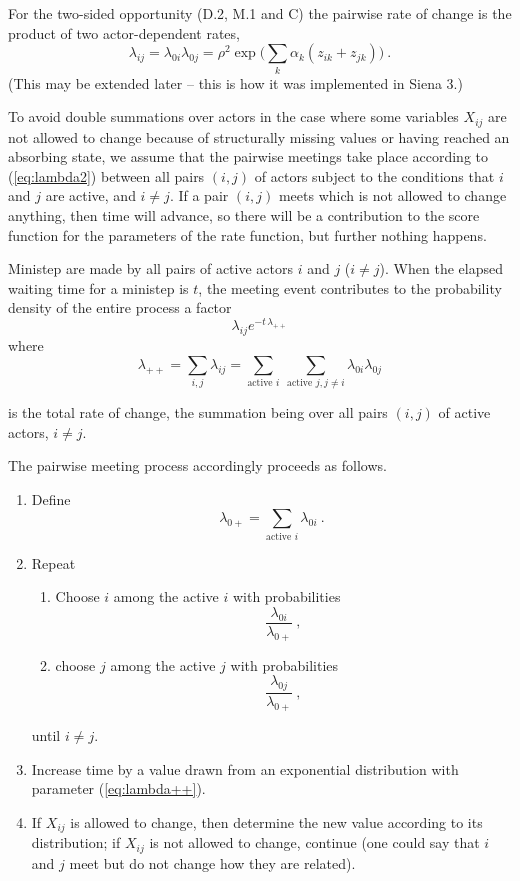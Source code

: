 \documentclass[a4paper,12pt,fleqn]{article}
\begin{document}
For the two-sided opportunity (D.2, M.1 and C) the pairwise rate of change is
the product of two actor-dependent rates,
\begin{equation}
\lambda_{ij} = \lambda_{0i}\lambda_{0j} =
   \rho^2\exp\Big(\sum_k \alpha_k (z_{ik} + z_{jk})\Big) \ . \label{eq:lambda2}
\end{equation}
(This may be extended later -- this is how it was implemented in Siena 3.)

To avoid double summations over actors in the case where some variables $X_{ij}$
are not allowed to change because of structurally missing values or
having reached an absorbing state,
we assume that the pairwise meetings take place
according to (\ref{eq:lambda2}) between all pairs $(i,j)$
of actors subject to the conditions that $i$ and $j$ are active, and $i \neq j$.
If a pair $(i,j)$ meets  which is not allowed to change anything,
then time will advance, so
there will be a contribution to the score function for the parameters of the
rate function, but further nothing happens.

Ministep are made by all pairs of active actors $i$ and $j$ ($i \neq j$).
When the elapsed waiting time for a ministep is $t$, the meeting event contributes
to the probability density of the entire process a factor
\[
\lambda_{ij} e^{-t\,\lambda_{++}}
\]
where
\begin{equation}
\lambda_{++} = \sum_{i,j} \lambda_{ij} =
       \sum_{\text{active }i} \ \sum_{\text{active }j, j \neq i}
                     \lambda_{0i}\lambda_{0j}         \label{eq:lambda++}
\end{equation}

is the total rate of change,
the summation being over all pairs $(i,j)$ of active actors, $i \neq j$.


The pairwise meeting process accordingly proceeds as follows.
\begin{enumerate}
\item Define
      \begin{equation}
          \lambda_{0+} =   \sum_{\text{active }i} \lambda_{0i} \ .
      \end{equation}
\item Repeat
      \begin{enumerate}
       \item Choose $i$ among the active $i$ with probabilities
             \[
              \frac{\lambda_{0i}} {\lambda_{0+}} \ ,
              \]
       \item choose $j$ among the active $j$ with probabilities
             \[
              \frac{\lambda_{0j}} {\lambda_{0+}} \ ,
              \]
       \end{enumerate}
       until $i \neq j$.
\item Increase time by a value drawn from an exponential distribution with parameter
      (\ref{eq:lambda++}).
\item If $X_{ij}$ is allowed to change, then determine the new value according
      to its distribution; if $X_{ij}$ is not allowed to change, continue
      (one could say that $i$ and $j$ meet but do not change how they are related).
\end{enumerate}
\end{document}
